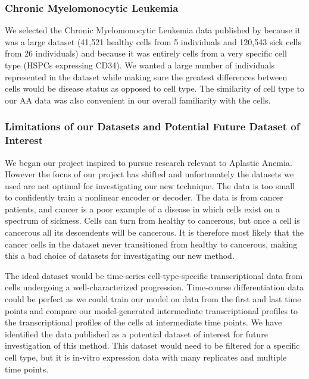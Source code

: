 \documentclass{article}
\begin{document}
\subsubsection{Chronic Myelomonocytic Leukemia}
We selected the Chronic Myelomonocytic Leukemia data published by \citet{ferrall-fairbanks_progenitor_2022} because it was a large dataset (41,521 healthy cells from 5 individuals and 120,543 sick cells from 26 individuals) and because it was entirely cells from a very specific cell type (HSPCs expressing CD34).
We wanted a large number of individuals represented in the dataset while making sure the greatest differences between cells would be disease status as opposed to cell type.
The similarity of cell type to our AA data was also convenient in our overall familiarity with the cells.

\subsubsection{Limitations of our Datasets and Potential Future Dataset of Interest}
We began our project inspired to pursue research relevant to Aplastic Anemia.
However the focus of our project has shifted and unfortunately the datasets we used are not optimal for investigating our new technique.
The \citet{tonglin_single-cell_2022} data is too small to confidently train a nonlinear encoder or decoder.
The \citet{ferrall-fairbanks_progenitor_2022} data is from cancer patients, and cancer is a poor example of a disease in which cells exist on a spectrum of sickness.
Cells can turn from healthy to cancerous, but once a cell is cancerous all its descendents will be cancerous.
It is therefore most likely that the cancer cells in the dataset never transitioned from healthy to cancerous, making this a bad choice of datasets for investigating our new method.

The ideal dataset would be time-series cell-type-specific transcriptional data from cells undergoing a well-characterized progression.
Time-course differentiation data could be perfect as we could train our model on data from the first and last time points and compare our model-generated intermediate transcriptional profiles to the transcriptional profiles of the cells at intermediate time points.
We have identified the data published \citet{lu_single-cell_2020} as a potential dataset of interest for future investigation of this method.
This dataset would need to be filtered for a specific cell type, but it is in-vitro expression data with many replicates and multiple time points.
\end{document}
